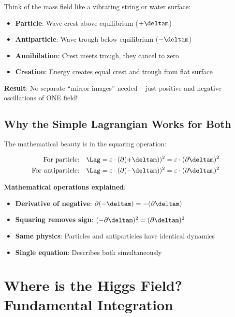 	\begin{tcolorbox}[colback=green!5!white,colframe=green!75!black,title=Elegant Antiparticle Picture]
		Think of the mass field like a vibrating string or water surface:
		\begin{itemize}
			\item \textbf{Particle}: Wave crest above equilibrium ($+\deltam$)
			\item \textbf{Antiparticle}: Wave trough below equilibrium ($-\deltam$)
			\item \textbf{Annihilation}: Crest meets trough, they cancel to zero
			\item \textbf{Creation}: Energy creates equal crest and trough from flat surface
		\end{itemize}
		
		\textbf{Result}: No separate ``mirror images'' needed -- just positive and negative oscillations of ONE field!
	\end{tcolorbox}
	
	\subsection{Why the Simple Lagrangian Works for Both}
	
	The mathematical beauty is in the squaring operation:
	
	\begin{align}
		\text{For particle:} \quad \Lag &= \varepsilon \cdot (\partial (+\deltam))^2 = \varepsilon \cdot (\partial \deltam)^2 \\
		\text{For antiparticle:} \quad \Lag &= \varepsilon \cdot (\partial (-\deltam))^2 = \varepsilon \cdot (\partial \deltam)^2
	\end{align}
	
	\textbf{Mathematical operations explained}:
	\begin{itemize}
		\item \textbf{Derivative of negative}: $\partial(-\deltam) = -(\partial\deltam)$
		\item \textbf{Squaring removes sign}: $(-\partial\deltam)^2 = (\partial\deltam)^2$
		\item \textbf{Same physics}: Particles and antiparticles have identical dynamics
		\item \textbf{Single equation}: Describes both simultaneously
	\end{itemize}
	
	\section{Where is the Higgs Field? Fundamental Integration}
	
